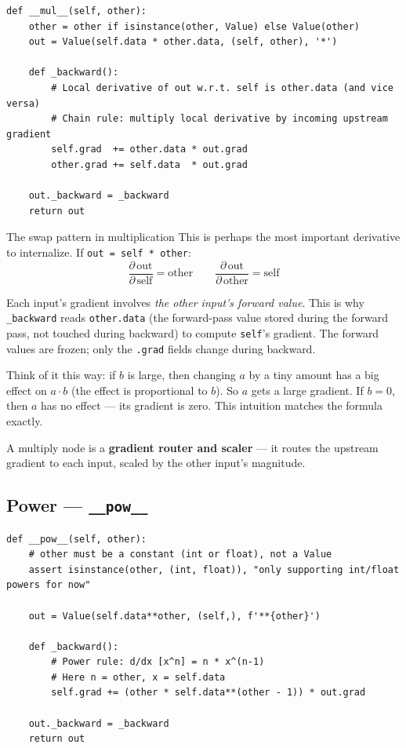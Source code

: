 \documentclass[12pt,a4paper]{article}
\newcommand{\code}[1]{\texttt{\small\color{deepblue}#1}}
\begin{document}
\begin{lstlisting}
def __mul__(self, other):
    other = other if isinstance(other, Value) else Value(other)
    out = Value(self.data * other.data, (self, other), '*')

    def _backward():
        # Local derivative of out w.r.t. self is other.data (and vice versa)
        # Chain rule: multiply local derivative by incoming upstream gradient
        self.grad  += other.data * out.grad
        other.grad += self.data  * out.grad

    out._backward = _backward
    return out
\end{lstlisting}

\begin{codeexplainbox}{The swap pattern in multiplication}
This is perhaps the most important derivative to internalize. If \code{out = self * other}:
\[
\frac{\partial\,\text{out}}{\partial\,\text{self}} = \text{other} \qquad \frac{\partial\,\text{out}}{\partial\,\text{other}} = \text{self}
\]

Each input's gradient involves \emph{the other input's forward value}. This is why \code{\_backward} reads \code{other.data} (the forward-pass value stored during the forward pass, not touched during backward) to compute \code{self}'s gradient. The forward values are frozen; only the \code{.grad} fields change during backward.

Think of it this way: if $b$ is large, then changing $a$ by a tiny amount has a big effect on $a \cdot b$ (the effect is proportional to $b$). So $a$ gets a large gradient. If $b = 0$, then $a$ has no effect — its gradient is zero. This intuition matches the formula exactly.

A multiply node is a \textbf{gradient router and scaler} — it routes the upstream gradient to each input, scaled by the other input's magnitude.
\end{codeexplainbox}

\subsection{Power — \texttt{\_\_pow\_\_}}

\begin{lstlisting}
def __pow__(self, other):
    # other must be a constant (int or float), not a Value
    assert isinstance(other, (int, float)), "only supporting int/float powers for now"

    out = Value(self.data**other, (self,), f'**{other}')

    def _backward():
        # Power rule: d/dx [x^n] = n * x^(n-1)
        # Here n = other, x = self.data
        self.grad += (other * self.data**(other - 1)) * out.grad

    out._backward = _backward
    return out
\end{lstlisting}
\end{document}
